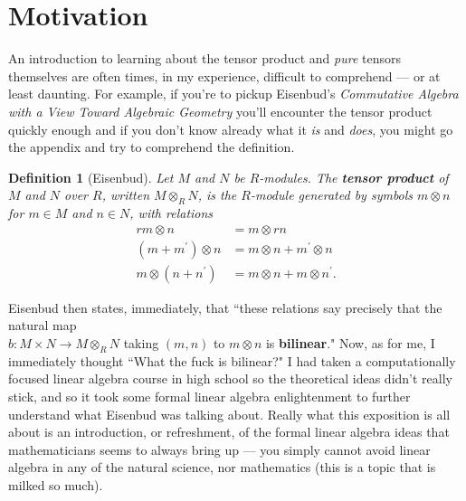 \documentclass[12pt,reqno]{amsart}
\theoremstyle{plain}
\newtheorem{defi}{Definition}
\begin{document}
\maketitle
\tableofcontents
\newpage
\section{Motivation}

An introduction to learning about the tensor product and \textit{pure} tensors themselves are often times, in my experience, difficult to comprehend — or at least daunting. For example, if you're to pickup Eisenbud's \textit{Commutative Algebra with a View Toward Algebraic Geometry} you'll encounter the tensor product quickly enough and if you don't know already what it \textit{is} and \textit{does}, you might go the appendix and try to comprehend the definition. 
\begin{defi}[Eisenbud] Let $M$ and $N$ be $R$-modules. The \textbf{tensor product} of $M$ and $N$ over $R$, written $M \otimes_R N$, is the $R$-module generated by symbols $m \otimes n$ for $m \in M$ and $n \in N$, with relations 
\begin{align*}
rm \otimes n &= m \otimes rn \\
(m + m^{\prime}) \otimes n &= m \otimes n + m^{\prime} \otimes n  \\
m \otimes (n + n^{\prime}) &= m \otimes n + m \otimes n^{\prime}.
\end{align*}
\end{defi} 

Eisenbud then states, immediately, that ``these relations say precisely that the natural map 
\\ $b \colon M \times N \to M \otimes_R N$ taking $(m, n)$ to $m \otimes n$ is \textbf{bilinear}." Now, as for me, I immediately thought ``What the fuck is bilinear?" I had taken a computationally focused linear algebra course in high school so the theoretical ideas didn't really stick, and so it took some formal linear algebra enlightenment to further understand what Eisenbud was talking about. Really what this exposition is all about is an introduction, or refreshment, of the formal linear algebra ideas that mathematicians seems to always bring up — you simply cannot avoid linear algebra in any of the natural science, nor mathematics (this is a topic that is milked so much).  
\end{document}

